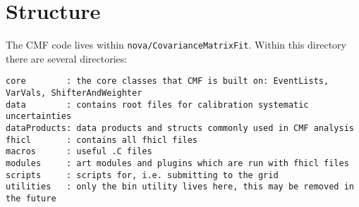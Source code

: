 \section{Structure}

The CMF code lives within \lstinline{nova/CovarianceMatrixFit}. Within this directory there are several directories:

\begin{lstlisting}
core 		: the core classes that CMF is built on: EventLists, VarVals, ShifterAndWeighter
data		: contains root files for calibration systematic uncertainties
dataProducts: data products and structs commonly used in CMF analysis
fhicl		: contains all fhicl files
macros 		: useful .C files
modules 	: art modules and plugins which are run with fhicl files
scripts 	: scripts for, i.e. submitting to the grid
utilities   : only the bin utility lives here, this may be removed in the future
\end{lstlisting}